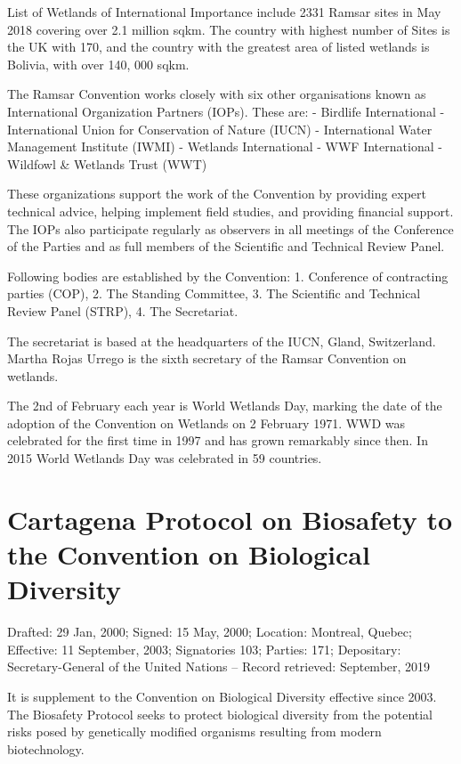 \documentclass[
]{book}
\begin{document}
List of Wetlands of International Importance include 2331 Ramsar sites in May 2018 covering over 2.1 million sqkm. The country with highest number of Sites is the UK with 170, and the country with the greatest area of listed wetlands is Bolivia, with over 140, 000 sqkm.

The Ramsar Convention works closely with six other organisations known as International Organization Partners (IOPs). These are:
- Birdlife International
- International Union for Conservation of Nature (IUCN)
- International Water Management Institute (IWMI)
- Wetlands International
- WWF International
- Wildfowl \& Wetlands Trust (WWT)

These organizations support the work of the Convention by providing expert technical advice, helping implement field studies, and providing financial support. The IOPs also participate regularly as observers in all meetings of the Conference of the Parties and as full members of the Scientific and Technical Review Panel.

Following bodies are established by the Convention: 1. Conference of contracting parties (COP), 2. The Standing Committee, 3. The Scientific and Technical Review Panel (STRP), 4. The Secretariat.

The secretariat is based at the headquarters of the IUCN, Gland, Switzerland. Martha Rojas Urrego is the sixth secretary of the Ramsar Convention on wetlands.

The 2nd of February each year is World Wetlands Day, marking the date of the adoption of the Convention on Wetlands on 2 February 1971. WWD was celebrated for the first time in 1997 and has grown remarkably since then. In 2015 World Wetlands Day was celebrated in 59 countries.

\hypertarget{cartagena-protocol-on-biosafety-to-the-convention-on-biological-diversity}{%
\section{Cartagena Protocol on Biosafety to the Convention on Biological Diversity}\label{cartagena-protocol-on-biosafety-to-the-convention-on-biological-diversity}}

Drafted: 29 Jan, 2000; Signed: 15 May, 2000; Location: Montreal, Quebec; Effective: 11 September, 2003; Signatories 103; Parties: 171; Depositary: Secretary-General of the United Nations -- Record retrieved: September, 2019

It is supplement to the Convention on Biological Diversity effective since 2003. The Biosafety Protocol seeks to protect biological diversity from the potential risks posed by genetically modified organisms resulting from modern biotechnology.
\end{document}
